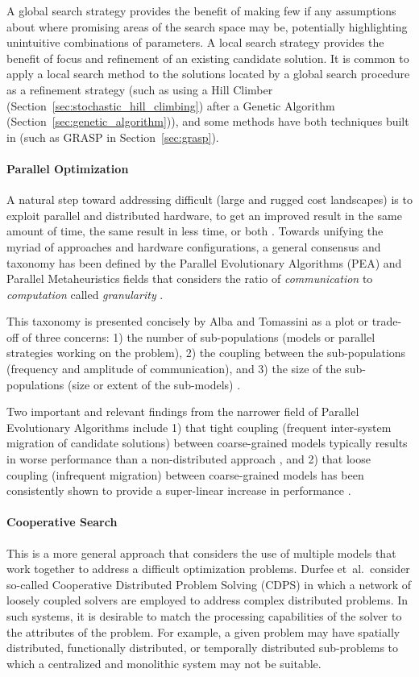 A global search strategy provides the benefit of making few if any assumptions about where promising areas of the search space may be, potentially highlighting unintuitive combinations of parameters. A local search strategy provides the benefit of focus and refinement of an existing candidate solution. It is common to apply a local search method to the solutions located by a global search procedure as a refinement strategy (such as using a Hill Climber (Section~\ref{sec:stochastic_hill_climbing}) after a Genetic Algorithm (Section~\ref{sec:genetic_algorithm})), and some methods have both techniques built in (such as GRASP in Section~\ref{sec:grasp}).
	
\paragraph{Parallel Optimization}
A natural step toward addressing difficult (large and rugged cost landscapes) is to exploit parallel and distributed hardware, to get an improved result in the same amount of time, the same result in less time, or both \cite{Crainic2005}. Towards unifying the myriad of approaches and hardware configurations, a general consensus and taxonomy has been defined by the Parallel Evolutionary Algorithms (PEA) and Parallel Metaheuristics fields that considers the ratio of \emph{communication} to \emph{computation} called \emph{granularity} \cite{Cantu-Paz2000, Alba2005a}. 

This taxonomy is presented concisely by Alba and Tomassini as a plot or trade-off of three concerns: 1) the number of sub-populations (models or parallel strategies working on the problem), 2) the coupling between the sub-populations (frequency and amplitude of communication), and 3) the size of the sub-populations (size or extent of the sub-models) \cite{Alba2002}. 

Two important and relevant findings from the narrower field of Parallel Evolutionary Algorithms include 1) that tight coupling (frequent inter-system migration of candidate solutions) between coarse-grained models typically results in worse performance than a non-distributed approach \cite{Alba2000}, and 2) that loose coupling (infrequent migration) between coarse-grained models has been consistently shown to provide a super-linear increase in performance \cite{Alba2002a, Belding1995, Cantu-Paz2000}.
	
\paragraph{Cooperative Search}
This is a more general approach that considers the use of multiple models that work together to address a difficult optimization problems. Durfee et~al.\ consider so-called Cooperative Distributed Problem Solving (CDPS) in which a network of loosely coupled solvers are employed to address complex distributed problems. In such systems, it is desirable to match the processing capabilities of the solver to the attributes of the problem. For example, a given problem may have spatially distributed, functionally distributed, or temporally distributed sub-problems to which a centralized and monolithic system may not be suitable. 

